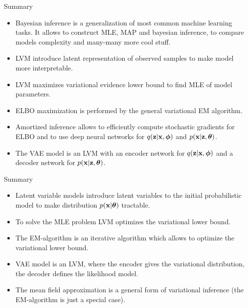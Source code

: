 \begin{frame}{Summary}
\begin{itemize}
	\item Bayesian inference is a generalization of most common machine learning tasks. It allows to construct MLE, MAP and bayesian inference, to compare models complexity and many-many more cool stuff.
	\item LVM introduce latent representation of observed samples to make model more interpretable.
	\item LVM maximizes variational evidence lower bound to find MLE of model parameters.
	\item ELBO maximization is performed by the general variational EM algorithm.
	\item Amortized inference allows to efficiently compute stochastic gradients for ELBO and to use deep neural networks for $q(\mathbf{z} | \mathbf{x}, \boldsymbol{\phi})$ and $p(\mathbf{x} | \mathbf{z}, \boldsymbol{\theta})$.
	\item The VAE model is an LVM with an encoder network for $q(\mathbf{z} | \mathbf{x}, \boldsymbol{\phi})$ and a decoder network for $p(\mathbf{x} | \mathbf{z}, \boldsymbol{\theta})$.
\end{itemize}
\end{frame}
\begin{frame}{Summary}

\begin{itemize}
	\item Latent variable models introduce latent variables to the initial probabilistic model to make distribution $p(\mathbf{x} | \boldsymbol{\theta})$ tractable.
	\item To solve the MLE problem LVM optimizes the variational lower bound.
	\item The EM-algorithm is an iterative algorithm which allows to optimize the variational lower bound.
	\item VAE model is an LVM, where the encoder gives the variational distribution, the decoder defines the likelihood model.
	\item The mean field approximation is a general form of variational inference (the EM-algorithm is just a special case).
\end{itemize}
\end{frame}
 